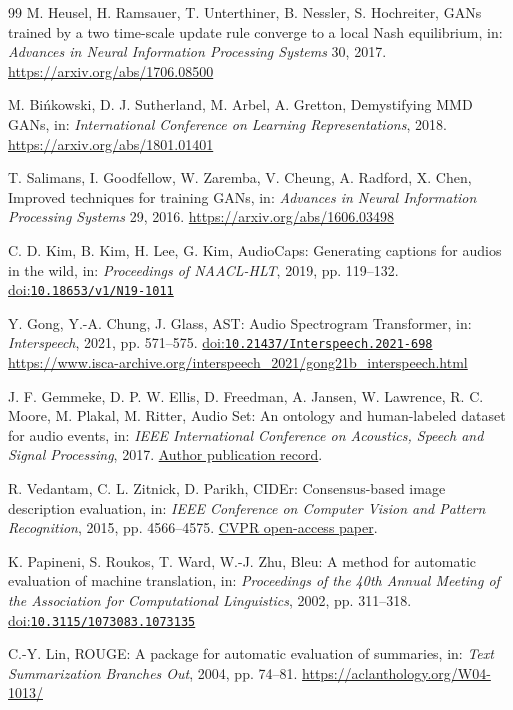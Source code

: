 \documentclass[a4paper,fleqn]{cas-dc}
\providecommand{\doi}[1]{%
  \href{https://doi.org/#1}{doi:\nolinkurl{#1}}}
\begin{document}
\begin{thebibliography}{99}
M. Heusel, H. Ramsauer, T. Unterthiner, B. Nessler, S. Hochreiter,
GANs trained by a two time-scale update rule converge
to a local Nash equilibrium,
in: \emph{Advances in Neural Information Processing Systems}
30, 2017.
\url{https://arxiv.org/abs/1706.08500}


M. Bi\'nkowski, D. J. Sutherland, M. Arbel, A. Gretton,
Demystifying MMD GANs,
in: \emph{International Conference on Learning Representations}, 2018.
\url{https://arxiv.org/abs/1801.01401}


T. Salimans, I. Goodfellow, W. Zaremba, V. Cheung,
A. Radford, X. Chen,
Improved techniques for training GANs,
in: \emph{Advances in Neural Information Processing Systems}
29, 2016.
\url{https://arxiv.org/abs/1606.03498}


C. D. Kim, B. Kim, H. Lee, G. Kim,
AudioCaps: Generating captions for audios in the wild,
in: \emph{Proceedings of NAACL-HLT}, 2019, pp. 119--132.
\doi{10.18653/v1/N19-1011}


Y. Gong, Y.-A. Chung, J. Glass,
AST: Audio Spectrogram Transformer,
in: \emph{Interspeech}, 2021, pp. 571--575.
\doi{10.21437/Interspeech.2021-698}
\url{https://www.isca-archive.org/interspeech_2021/gong21b_interspeech.html}


J. F. Gemmeke, D. P. W. Ellis, D. Freedman, A. Jansen,
W. Lawrence, R. C. Moore, M. Plakal, M. Ritter,
Audio Set: An ontology and human-labeled dataset for audio events,
in: \emph{IEEE International Conference on Acoustics,
Speech and Signal Processing}, 2017.
\href{https://research.google/pubs/audio-set-an-ontology-and-human-labeled-dataset-for-audio-events/}
{Author publication record}.


R. Vedantam, C. L. Zitnick, D. Parikh,
CIDEr: Consensus-based image description evaluation,
in: \emph{IEEE Conference on Computer Vision and Pattern Recognition},
2015, pp. 4566--4575.
\href{https://openaccess.thecvf.com/content_cvpr_2015/html/Vedantam_CIDEr_Consensus-Based_Image_2015_CVPR_paper.html}
{CVPR open-access paper}.


K. Papineni, S. Roukos, T. Ward, W.-J. Zhu,
Bleu: A method for automatic evaluation of machine translation,
in: \emph{Proceedings of the 40th Annual Meeting of the
Association for Computational Linguistics}, 2002, pp. 311--318.
\doi{10.3115/1073083.1073135}


C.-Y. Lin,
ROUGE: A package for automatic evaluation of summaries,
in: \emph{Text Summarization Branches Out}, 2004, pp. 74--81.
\url{https://aclanthology.org/W04-1013/}



\end{thebibliography}
\end{document}
